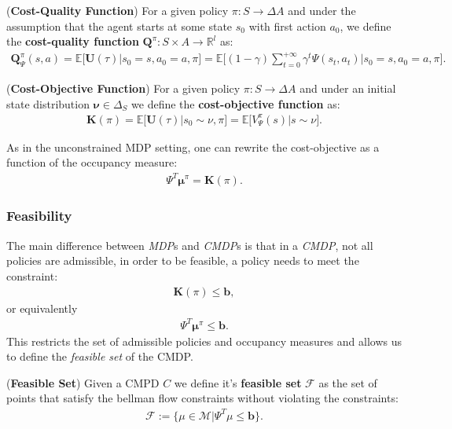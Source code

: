 \begin{definition}
    (\textbf{Cost-Quality Function})
    For a given policy $\pi:S\rightarrow \Delta A$ and under the assumption that the agent starts at some state $s_0$ with first action $a_0$, we define the \textbf{cost-quality function} $\bm{Q}^\pi:S\times A \rightarrow \mathbb{R}^l$ as:
    \begin{align*}
        \bm{Q}_\Psi^\pi(s,a) = \mathbb{E}\Big[ \bm{U}(\tau)  \Big| s_0  = s, a_0  = a, \pi \Big] = \mathbb{E}\Bigg[  (1-\gamma) \sum_{t=0}^{+\infty} \gamma^t  \Psi(s_t,a_t) \Big| s_0  = s, a_0 = a, \pi \Bigg].
    \end{align*}
\end{definition}

\begin{definition}
    (\textbf{Cost-Objective Function})
    For a given policy $\pi:S\rightarrow \Delta A$ and under an initial state distribution $\bm{\nu} \in \Delta_S$ we define the \textbf{cost-objective function} as:
    \begin{align*}
        \bm{K}(\pi) = \mathbb{E}\Big[  \bm{U}(\tau) \Big| s_0 \sim \nu, \pi \Big] =  \mathbb{E}\Big[ V_\Psi^\pi(s) \Big| s \sim \nu\Big].
    \end{align*}
\end{definition}

\begin{observation}
    As in the unconstrained MDP setting, one can rewrite the cost-objective as a function of the occupancy measure:
    \begin{align*}
        \Psi^T \bm{\mu}^\pi = \bm{K}(\pi).
    \end{align*}
\end{observation}

\subsubsection{Feasibility}

The main difference between \textit{MDP}s and \textit{CMDP}s is that in a \textit{CMDP}, not all policies are admissible, in order to be feasible, a policy needs to meet the constraint:
\begin{align*}
    \bm{K}(\pi) \leq \bm{b},
\end{align*}
or equivalently
\begin{align*}
    \Psi^T \bm{\mu}^\pi \leq \bm{b}.
\end{align*}
This restricts the set of admissible policies and occupancy measures and allows us to define the \textit{feasible set} of the CMDP.
\begin{definition}
    (\textbf{Feasible Set}) Given a CMPD $\textit{C}$ we define it's \textbf{feasible set} $\mathcal{F}$ as the set of points that satisfy the bellman flow constraints without violating the constraints:
    \begin{align*}
        \mathcal{F} := \big\{ \mu \in \mathcal{M} \big| \Psi^T\mu\leq \bm{b} \big\}.
    \end{align*}
\end{definition}

